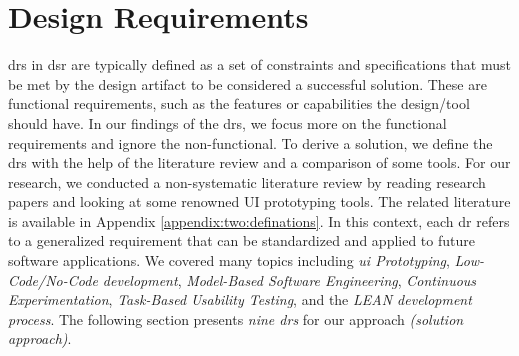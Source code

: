 \section{Design Requirements}
\label{design:section:designReqs}
\ac{dr}s in \ac{dsr} are typically defined as a set of constraints and specifications that must be met by the design artifact to be considered a successful solution. 
These are functional requirements, such as the features or capabilities the design/tool should have.
In our findings of the \ac{dr}s, we focus more on the functional requirements and ignore the non-functional.
To derive a solution, we define the \ac{dr}s with the help of the literature review and a comparison of some tools.
For our research, we conducted a non-systematic literature review by reading research papers and looking at some renowned UI prototyping tools. 
The related literature is available in Appendix \ref{appendix:two:definations}.
In this context, each \ac{dr} refers to a generalized requirement that can be standardized and applied to future software applications.
We covered many topics including \textit{\ac{ui} Prototyping}, \textit{Low-Code/No-Code development}, \textit{Model-Based Software Engineering}, \textit{Continuous Experimentation}, \textit{Task-Based Usability Testing}, and the \textit{LEAN development process}.
The following section presents \textit{nine \ac{dr}s} for our approach \textit{(solution approach)}.
